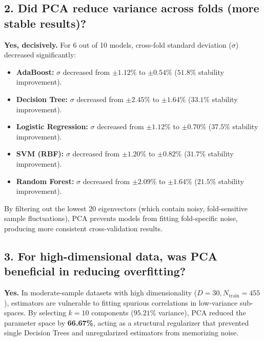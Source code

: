 \documentclass[12pt,a4paper]{article}
\begin{document}
\subsection{2. Did PCA reduce variance across folds (more stable results)?}
\textbf{Yes, decisively.} For 6 out of 10 models, cross-fold standard deviation ($\sigma$) decreased significantly:
\begin{itemize}
\item \textbf{AdaBoost:} $\sigma$ decreased from $\pm 1.12\%$ to $\mathbf{\pm 0.54\%}$ ($51.8\%$ stability improvement).
\item \textbf{Decision Tree:} $\sigma$ decreased from $\pm 2.45\%$ to $\mathbf{\pm 1.64\%}$ ($33.1\%$ stability improvement).
\item \textbf{Logistic Regression:} $\sigma$ decreased from $\pm 1.12\%$ to $\mathbf{\pm 0.70\%}$ ($37.5\%$ stability improvement).
\item \textbf{SVM (RBF):} $\sigma$ decreased from $\pm 1.20\%$ to $\mathbf{\pm 0.82\%}$ ($31.7\%$ stability improvement).
\item \textbf{Random Forest:} $\sigma$ decreased from $\pm 2.09\%$ to $\mathbf{\pm 1.64\%}$ ($21.5\%$ stability improvement).
\end{itemize}
By filtering out the lowest 20 eigenvectors (which contain noisy, fold-sensitive sample fluctuations), PCA prevents models from fitting fold-specific noise, producing more consistent cross-validation results.

\subsection{3. For high-dimensional data, was PCA beneficial in reducing overfitting?}
\textbf{Yes.} In moderate-sample datasets with high dimensionality ($D=30, N_{\text{train}}=455$), estimators are vulnerable to fitting spurious correlations in low-variance sub-spaces. By selecting $k=10$ components ($95.21\%$ variance), PCA reduced the parameter space by \textbf{66.67\%}, acting as a structural regularizer that prevented single Decision Trees and unregularized estimators from memorizing noise.
\end{document}
